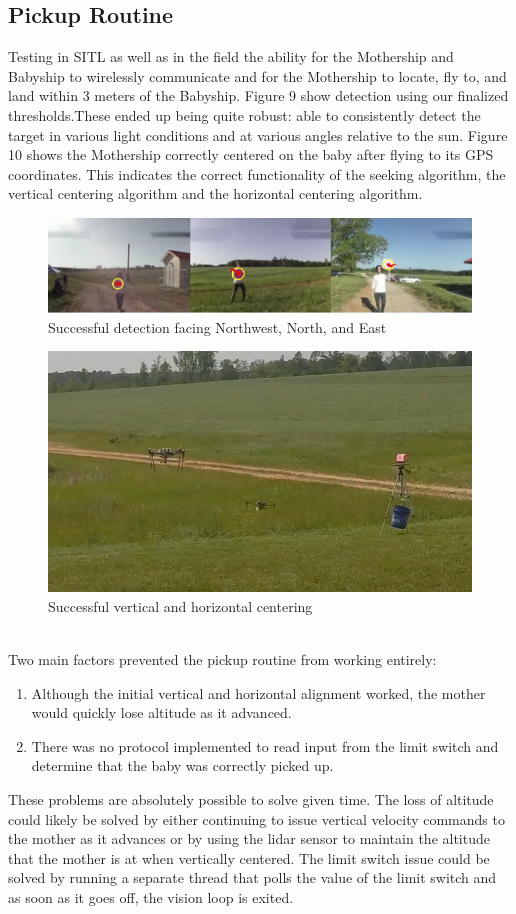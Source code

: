 \documentclass[11pt]{article}
\begin{document}
\subsection{Pickup Routine}
Testing in SITL as well as in the field the ability for the Mothership and Babyship to wirelessly communicate and for the Mothership to locate, fly to, and land within 3 meters of the Babyship.
Figure 9 show detection using our finalized thresholds.These ended up being quite robust: able to consistently detect the target in various light conditions and at various angles relative to the sun.
Figure 10 shows the Mothership correctly centered on the baby after flying to its GPS coordinates. This indicates the correct functionality of the seeking algorithm, the vertical centering algorithm and the horizontal centering algorithm.
\begin{figure}[htp]
    \centering
    \includegraphics[scale=0.6]{All_Directions.png}
    \caption{Successful detection facing Northwest, North, and East}
\end{figure}
\begin{figure}[htp]
    \centering
    \includegraphics[scale=0.5]{Centering.png}
    \caption{Successful vertical and horizontal centering}
\end{figure}\\
Two main factors prevented the pickup routine from working entirely:
\begin{enumerate}
    \item Although the initial vertical and horizontal alignment worked, the mother would quickly lose altitude as it advanced.
    \item There was no protocol implemented to read input from the limit switch and determine that the baby was correctly picked up.
\end{enumerate}
These problems are absolutely possible to solve given time. The loss of altitude could likely be solved by either continuing to issue vertical velocity commands to the mother as it advances  or by using the lidar sensor to maintain the altitude that the mother is at when vertically centered. The  limit switch issue could be solved by running a separate thread that polls the value of the limit switch and as soon as it goes off, the vision loop is exited.
\end{document}
